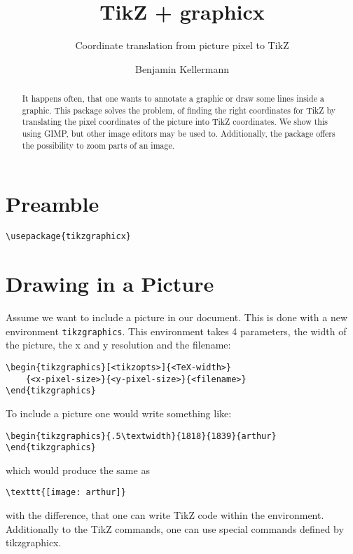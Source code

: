 \documentclass{scrartcl}
\title{TikZ + graphicx}
\subtitle{Coordinate translation from picture pixel to TikZ}
\author{Benjamin Kellermann}
\begin{document}
\maketitle
\begin{abstract}
	It happens often, that one wants to annotate a graphic or draw some lines inside a graphic.
	This package solves the problem, of finding the right coordinates for TikZ by translating the pixel coordinates of the picture into TikZ coordinates.
	We show this using GIMP, but other image editors may be used to.
	Additionally, the package offers the possibility to zoom parts of an image.
\end{abstract}

\section{Preamble}
\begin{lstlisting}
\usepackage{tikzgraphicx}
\end{lstlisting}

\section{Drawing in a Picture}
Assume we want to include a picture in our document. 
This is done with a new environment \lstinline+tikzgraphics+.
This environment takes 4 parameters, the width of the picture, the x and y resolution and the filename:
\begin{lstlisting}
\begin{tikzgraphics}[<tikzopts>]{<TeX-width>}
	{<x-pixel-size>}{<y-pixel-size>}{<filename>}
\end{tikzgraphics}
\end{lstlisting}
To include a picture one would write something like:
\begin{lstlisting}
\begin{tikzgraphics}{.5\textwidth}{1818}{1839}{arthur}
\end{tikzgraphics}
\end{lstlisting}
which would produce the same as
\begin{lstlisting}
\texttt{[image: arthur]}
\end{lstlisting}
with the difference, that one can write TikZ code within the environment.
Additionally to the TikZ commands, one can use special commands defined by tikzgraphicx. 
\end{document}
